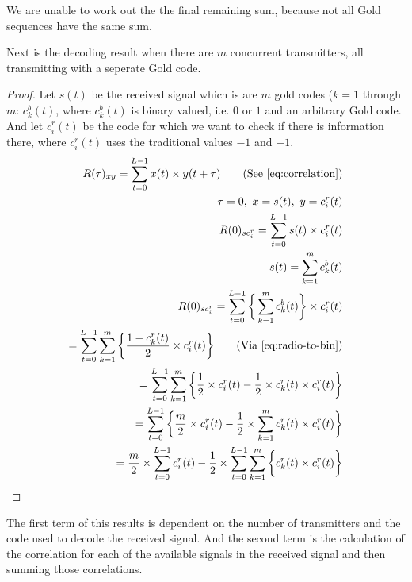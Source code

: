		We are unable to work out the the final remaining sum, because not all Gold sequences have the same sum.

		Next is the decoding result when there are $m$ concurrent transmitters, all transmitting with a seperate Gold code.


		\begin{proof}
			Let $s(t)$ be the received signal which is are $m$ gold codes ($k = 1$ through $m$: $c^b_k(t)$, where $c^b_k(t)$ is binary valued, i.e. $0$ or $1$ and an arbitrary Gold code.\\
			And let $c^r_i(t)$ be the code for which we want to check if there is information there, where $c^r_i(t)$ uses the traditional values $-1$ and $+1$. \\

			\begin{align*}
				R(\tau)_{xy} = \displaystyle\sum_{t = 0} ^ {L - 1} x(t) \times y(t + \tau)	\tag{See \autoref{eq:correlation}}
				\\ \tau = 0,\ x = s(t),\ y = c^r_i(t)	
				\\ R(0)_{sc^r_{i}} = \displaystyle\sum_{t = 0} ^ {L - 1} s(t) \times c^r_i(t)	
				\\ s(t) = \displaystyle\sum_{k = 1} ^ {m} c^b_k(t)						
				\\ R(0)_{sc^r_{i}} = \displaystyle\sum_{t = 0} ^ {L - 1} \bigg\{ \displaystyle\sum_{k = 1} ^ {m} c^b_k(t) \bigg\} \times c^r_i(t)
				\\ = \displaystyle\sum_{t = 0} ^ {L - 1} \displaystyle\sum_{k = 1} ^ {m} \bigg\{ \frac{1 - c^r_k(t)}{2} \times c^r_i(t) \bigg\} \tag{Via \autoref{eq:radio-to-bin}}
				\\ = \displaystyle\sum_{t = 0} ^ {L - 1} \displaystyle\sum_{k = 1} ^ {m} \bigg\{ \frac{1}{2} \times c^r_i(t) - \frac{1}{2} \times c^r_k(t) \times c^r_i(t) \bigg\} 
				\\ = \displaystyle\sum_{t = 0} ^ {L - 1} \bigg\{ \frac{m}{2} \times c^r_i(t) - \frac{1}{2} \times \displaystyle\sum_{k = 1} ^ {m} c^r_k(t) \times c^r_i(t) \bigg\} 
				\\ = \frac{m}{2} \times \displaystyle\sum_{t = 0} ^ {L - 1} c^r_i(t) - \frac{1}{2} \times \displaystyle\sum_{t = 0} ^ {L - 1} \displaystyle\sum_{k = 1} ^ {m} \bigg\{ c^r_k(t) \times c^r_i(t) \bigg\}
			\end{align*}

		\end{proof}

		The first term of this results is dependent on the number of transmitters and the code used to decode the received signal.
		And the second term is the calculation of the correlation for each of the available signals in the received signal and then summing those correlations.

